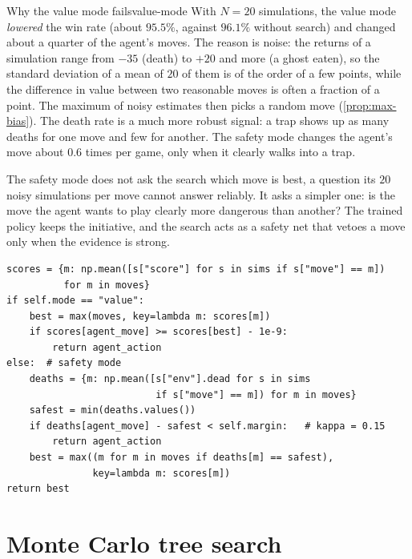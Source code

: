 \begin{pacman}{Why the value mode fails}{value-mode}
  With $N = 20$ simulations, the value mode \emph{lowered} the win rate
  (about $95.5\%$, against $96.1\%$ without search) and changed about a
  quarter of the agent's moves. The reason is noise: the returns of a
  simulation range from $-35$ (death) to $+20$ and more (a ghost eaten),
  so the standard deviation of a mean of $20$ of them is of the order of
  a few points, while the difference in value between two reasonable moves
  is often a fraction of a point. The maximum of noisy estimates then picks
  a random move (\cref{prop:max-bias}). The death rate is a much more
  robust signal: a trap shows up as many deaths for one move and few for
  another. The safety mode changes the agent's move about $0.6$ times per
  game, only when it clearly walks into a trap.
\end{pacman}

\begin{intuition}
  The safety mode does not ask the search which move is best, a question
  its $20$ noisy simulations per move cannot answer reliably. It asks a
  simpler one: is the move the agent wants to play clearly more dangerous
  than another? The trained policy keeps the initiative, and the search
  acts as a safety net that vetoes a move only when the evidence is strong.
\end{intuition}

\begin{lstlisting}[caption={Choosing the move (\code{pacman\_search.py},
  \code{LookaheadSearch.select\_action}, excerpt)}]
scores = {m: np.mean([s["score"] for s in sims if s["move"] == m])
          for m in moves}
if self.mode == "value":
    best = max(moves, key=lambda m: scores[m])
    if scores[agent_move] >= scores[best] - 1e-9:
        return agent_action
else:  # safety mode
    deaths = {m: np.mean([s["env"].dead for s in sims
                          if s["move"] == m]) for m in moves}
    safest = min(deaths.values())
    if deaths[agent_move] - safest < self.margin:   # kappa = 0.15
        return agent_action
    best = max((m for m in moves if deaths[m] == safest),
               key=lambda m: scores[m])
return best
\end{lstlisting}

\section{Monte Carlo tree search}

